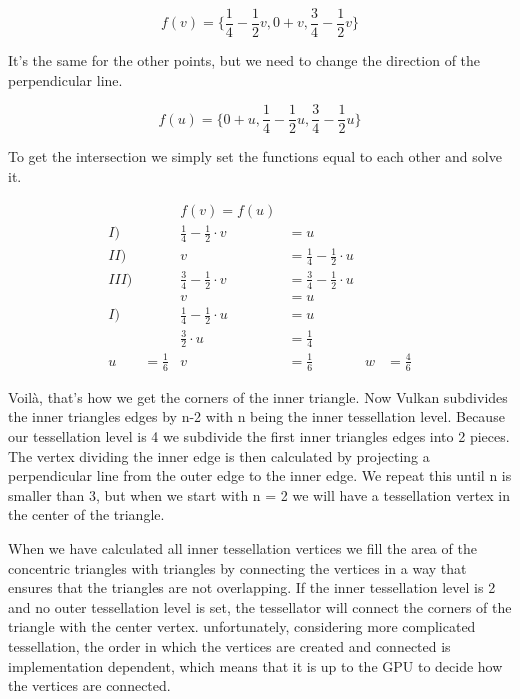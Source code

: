 \documentclass[12pt]{report} \usepackage{preamble}
\begin{document}
\[
	f(v) = \{\frac{1}{4} - \frac{1}{2}v, 0 + v, \frac{3}{4} - \frac{1}{2}v\}
\]

It's the same for the other points, but we need to change the direction of the perpendicular line.

\[
	f(u) = \{0+u, \frac{1}{4} - \frac{1}{2}u, \frac{3}{4} - \frac{1}{2}u\}
\]

To get the intersection we simply set the functions equal to each other and solve it.

\[
	\begin{aligned}
		     &               & f(v)= f(u)                                                                                \\
		I)   &               & \frac{1}{4} - \frac{1}{2}\cdot v & = u                                                    \\
		II)  &               & v                                & = \frac{1}{4} - \frac{1}{2}\cdot u                     \\
		III) &               & \frac{3}{4} -\frac{1}{2}\cdot v  & = \frac{3}{4} -\frac{1}{2}\cdot u                      \\
		     &               & v                                & = u                                                    \\
		I)   &               & \frac{1}{4} - \frac{1}{2}\cdot u & = u                                                    \\
		     &               & \frac{3}{2}\cdot u               & = \frac{1}{4}                                          \\
		u    & = \frac{1}{6} & v                                & = \frac{1}{6}                      & w & = \frac{4}{6}
	\end{aligned}
\]

Voil\`a, that's how we get the corners of the inner triangle.
Now Vulkan subdivides the inner triangles edges by n-2 with n being the
inner tessellation level. Because our tessellation level is 4
we subdivide the first inner triangles edges into 2 pieces.
The vertex dividing the inner edge is then calculated by projecting a
perpendicular line from the outer edge to the inner edge.
We repeat this until n is smaller than 3, but when we start with n = 2
we will have a tessellation vertex in the center of the triangle. \cite{tessellation}

When we have calculated all inner tessellation vertices we fill the area of the
concentric triangles with triangles by connecting the vertices in a way that
ensures that the triangles are not overlapping. If the inner tessellation level is 2 and
no outer tessellation level is set, the tessellator will connect the corners
of the triangle with the center vertex. \cite{tessellation}
unfortunately, considering more complicated tessellation, the order in which the vertices
are created and connected is implementation dependent,
which means that it is up to the \ac{GPU} to decide how the vertices are connected. \cite{tessellation}
\end{document}
